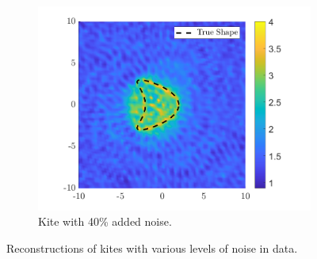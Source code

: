 \documentclass[]{article}
\begin{document}
\begin{figure}[h]
\begin{subfigure}{.3\textwidth}
					\includegraphics[width = \textwidth]{Numeric Simulations/Images/kite-40-noise-reconstructed}
					\caption{Kite with 40\% added noise.}
				\end{subfigure}
				\caption{Reconstructions of kites with various levels of noise in data.}
				\label{fig:kitenoise}
			\end{figure} 
		\printbibliography
			
\end{document}
